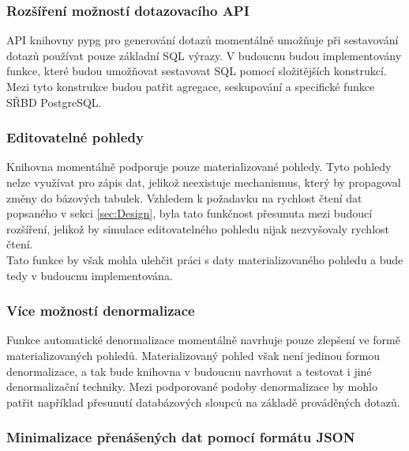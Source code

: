 \documentclass[ing,male,java,dept456]{diploma}						%
\begin{document}
\subsubsection{Rozšíření možností dotazovacího API}

API knihovny pypg pro generování dotazů momentálně umožňuje při sestavování dotazů používat pouze základní SQL výrazy. V budoucnu budou implementovány funkce, které budou umožňovat sestavovat SQL pomocí složitějších konstrukcí. Mezi tyto konstrukce budou patřit agregace, seskupování a specifické funkce SŘBD PostgreSQL.

\subsubsection{Editovatelné pohledy}
\label{subsubsec:EditView}

Knihovna momentálně podporuje pouze materializované pohledy. Tyto pohledy nelze využívat pro zápis dat, jelikož neexistuje mechanismus, který by propagoval změny do bázových tabulek. Vzhledem k požadavku na rychlost čtení dat popsaného v sekci \ref{sec:Design}, byla tato funkčnost přesunuta mezi budoucí rozšíření, jelikož by simulace editovatelného pohledu nijak nezvyšovaly rychlost čtení. \\
Tato funkce by však mohla ulehčit práci s daty materializovaného pohledu a bude tedy v budoucnu implementována.

\subsubsection{Více možností denormalizace}

Funkce automatické denormalizace momentálně navrhuje pouze zlepšení ve formě materializovaných pohledů. Materializovaný pohled však není jedinou formou denormalizace, a tak bude knihovna v budoucnu navrhovat a testovat i jiné denormalizační techniky. Mezi podporované podoby denormalizace by mohlo patřit například přesunutí databázových sloupců na základě prováděných dotazů.

\subsubsection{Minimalizace přenášených dat pomocí formátu JSON}
\end{document}
